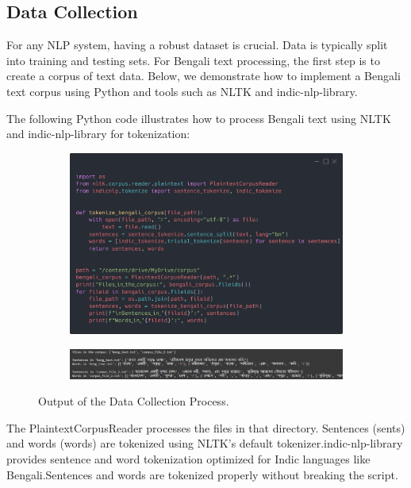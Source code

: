 \subsection{Data Collection} 

\cite{InfosysNLP:1}For any NLP system, having a robust dataset is crucial. Data is typically split into training and testing sets. For Bengali text processing, the first step is to create a corpus of text data. Below, we demonstrate how to implement a Bengali text corpus using Python and tools such as NLTK and indic-nlp-library.

The following Python code illustrates how to process Bengali text using NLTK and indic-nlp-library for tokenization:

\begin{figure}[H]
    \centering
    \begin{subfigure}{0.6\linewidth}
        \includegraphics[width=\linewidth]{Attachments/Figures/data-collection-for-nlp_figure1.png}
    \end{subfigure}
    \begin{subfigure}{0.6\linewidth}
        \includegraphics[width=\linewidth]{Attachments/Figures/data-collection-for-nlp_figure2.png}
    \end{subfigure}
    \caption{Output of the Data Collection Process.}
\end{figure}

The PlaintextCorpusReader processes the files in that directory. Sentences (sents) and words (words) are tokenized using NLTK’s default tokenizer.indic-nlp-library provides sentence and word tokenization optimized for Indic languages like Bengali.Sentences and words are tokenized properly without breaking the script.